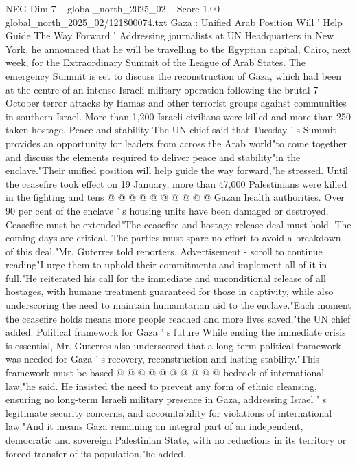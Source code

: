 \begin{textsample}{NEG Dim 7 – global\_north\_2025\_02 – Score 1.00 – global\_north\_2025\_02/121800074.txt}  \label{ex:f7_neg_177}
Gaza : Unified Arab Position Will ' Help Guide The Way Forward ' Addressing journalists at UN Headquarters in New York, he announced that he will be travelling to the Egyptian capital, Cairo, next week, for the Extraordinary Summit of the League of Arab States.
The emergency Summit is set to discuss the reconstruction of Gaza, which had been at the centre of an intense Israeli military operation following the brutal 7 October terror attacks by Hamas and other terrorist groups against communities in southern Israel.
More than 1,200 Israeli civilians were killed and more than 250 taken hostage.
Peace and stability The UN chief said that Tuesday ' s Summit provides an opportunity for leaders from across the Arab world"to come together and discuss the elements required to deliver peace and stability"in the enclave."Their unified position will help guide the way forward,"he stressed.
Until the ceasefire took effect on 19 January, more than 47,000 Palestinians were killed in the fighting and tens @ @ @ @ @ @ @ @ @ @ Gazan health authorities.
Over 90 per cent of the enclave ' s housing units have been damaged or destroyed.
Ceasefire must be extended"The ceasefire and hostage release deal must hold.
The coming days are critical.
The parties must spare no effort to avoid a breakdown of this deal,"Mr.
Guterres told reporters.
Advertisement - scroll to continue reading"I urge them to uphold their commitments and implement all of it in full."He reiterated his call for the immediate and unconditional release of all hostages, with humane treatment guaranteed for those in captivity, while also underscoring the need to maintain humanitarian aid to the enclave."Each moment the ceasefire holds means more people reached and more lives saved,"the UN chief added.
Political framework for Gaza ' s future While ending the immediate crisis is essential, Mr.
Guterres also underscored that a long-term political framework was needed for Gaza ' s recovery, reconstruction and lasting stability."This framework must be based @ @ @ @ @ @ @ @ @ @ bedrock of international law,"he said.
He insisted the need to prevent any form of ethnic cleansing, ensuring no long-term Israeli military presence in Gaza, addressing Israel ' s legitimate security concerns, and accountability for violations of international law."And it means Gaza remaining an integral part of an independent, democratic and sovereign Palestinian State, with no reductions in its territory or forced transfer of its population,"he added.

\end{textsample}
